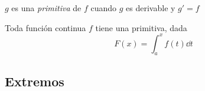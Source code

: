 \documentclass[11pt,a4paper]{article}
\begin{document}
\begin{definicion}
  $g$ es una \emph{primitiva} de $f$
  cuando $g$ es derivable y $g'=f$
\end{definicion}

\begin{corolario}
  Toda función continua $f$ tiene una primitiva, dada
  \[
    F(x)=\int_a^x f(t)\dd t
  \]
\end{corolario}


\subsection{Extremos}
\end{document}
